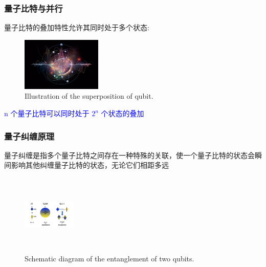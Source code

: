 \begin{frame}
    \frametitle{量子比特与并行}
        量子比特的叠加特性允许其同时处于多个状态:
            \begin{figure}
        \centering
                \includegraphics[height=1.0in, width=1.5in, viewport=0 0 1200 800,clip]{Figures/Quantum_Computing_2.jpg}
		\caption{\tiny{\textrm{Illustration of the superposition of qubit.}}}
		\label{Fig:Quantum_Computing_2}
            \end{figure}
	    \vskip -15pt
    {\fontsize{7.5pt}{5.2pt}}
    \vskip 2pt
	\textcolor{blue}{\textrm{n} 个量子比特可以同时处于 \( 2^n \) 个状态的叠加}\\
    {\fontsize{9.5pt}{5.2pt}\selectfont{\textcolor{red}{这使得量子计算机在一次操作中可以对 \( 2^n \) 个数据进行计算，实现并行计算，大大提高计算效率}}}
\end{frame}

\begin{frame}
    \frametitle{量子纠缠原理}
        量子纠缠是指多个量子比特之间存在一种特殊的关联，使一个量子比特的状态会瞬间影响其他纠缠量子比特的状态，无论它们相距多远
            \begin{figure}
        \centering
                \includegraphics[height=1.5in, width=1.0in, viewport=460 0 720 380,clip]{Figures/Illustration-of-a-bit_and_qubit.png}
		\caption{\tiny{\textrm{Schematic diagram of the entanglement of two qubits.}}}
		\label{Fig:Illustration-of-a-qubit-entanglement}
            \end{figure}
	    \vskip -10pt
	    {\fontsize{7.5pt}{5.2pt}\selectfont{利用量子纠缠可以实现高效的信息传输和处理，是量子通信和量子计算的重要资源}}
\end{frame}

